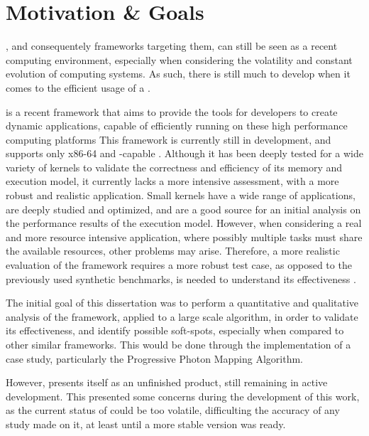 \documentclass[main.tex]{subfiles}
\begin{document}
\section{Motivation \& Goals}

\hetplats, and consequentely frameworks targeting them, can still be seen as a recent computing environment, especially when considering the volatility and constant evolution of computing systems. As such, there is still much to develop when it comes to the efficient usage of a \hetplat.



\gama is a recent framework that aims to provide the tools for developers to create dynamic applications, capable of efficiently running on these high performance computing platforms \cite{joao2012gama}
This framework is currently still in development, and supports only x86-64 \cpus and \cuda-capable \gpus. Although it has been deeply tested for a wide variety of kernels to validate the correctness and efficiency of its memory and execution model, it currently lacks a more intensive assessment, with a more robust and realistic application.
Small kernels have a wide range of applications, are deeply studied and optimized, and are a good source for an initial analysis on the performance results of the execution model. However, when considering a real and more resource intensive application, where possibly multiple tasks must share the available resources, other problems may arise. Therefore, a more realistic evaluation of the framework requires a more robust test case, as opposed to the previously used synthetic benchmarks, is needed to understand its effectiveness .

The initial goal of this dissertation was to perform a quantitative and qualitative analysis of the \gama framework, applied to a large scale algorithm, in order to validate its effectiveness, and identify possible soft-spots, especially when compared to other similar frameworks. This would be done through the implementation of a case study, particularly the Progressive Photon Mapping Algorithm.

However, \gama presents itself as an unfinished product, still remaining in active development. This presented some concerns during the development of this work, as the current status of \gama could be too volatile, difficulting the accuracy of any study made on it, at least until a more stable version was ready.
\end{document}
